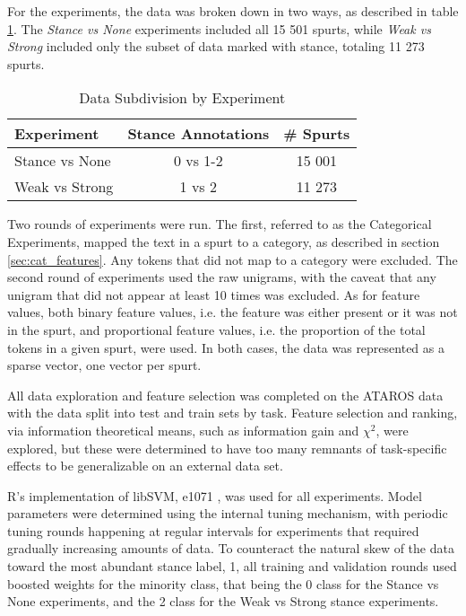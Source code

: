 For the experiments, the data was broken down in two ways, as described in table \ref{tab:experiment_breakdown}.  The \emph{Stance vs None} experiments included all 15 501 spurts, while \emph{Weak vs Strong} included only the subset of data marked with stance, totaling 11 273 spurts. 

\begin{table}[H]
\centering
\begin{tabular}{l | c | c}
	\textbf{Experiment} & \textbf{Stance Annotations} & \textbf{\# Spurts} \\ 
	\hline 
	Stance vs None & 0 vs 1-2           & 15 001 \\
	Weak vs Strong & 1 vs 2             & 11 273 \\ 
\end{tabular}
\caption{Data Subdivision by Experiment} 
\label{tab:experiment_breakdown} 
\end{table} 

Two rounds of experiments were run.  The first, referred to as the Categorical Experiments, mapped the text in a spurt to a category, as described in section \ref{sec:cat_features}. %
Any tokens that did not map to a category were excluded.  The second round of experiments used the raw unigrams, with the caveat that any unigram that did not appear at least 10 times was excluded.  As for feature values, both binary feature values, i.e. the feature was either present or it was not in the spurt, and proportional feature values, i.e. the proportion of the total tokens in a given spurt, were used.  In both cases, the data was represented as a sparse vector, one vector per spurt.  

All data exploration and feature selection was completed on the ATAROS data with the data split into test and train sets by task. Feature selection and ranking, via information theoretical means, such as information gain and $\chi^2$, were explored, but these were determined to have too many remnants of task-specific effects to be generalizable on an external data set. 

R's implementation of libSVM, e1071 \citep {meyer2014e1071}, was used for all experiments.  Model parameters were determined using the internal tuning mechanism, with periodic tuning rounds happening at regular intervals for experiments that required gradually increasing amounts of data.  To counteract the natural skew of the data toward the most abundant stance label, 1, all training and validation rounds used boosted weights for the minority class, that being the 0 class for the Stance vs None experiments, and the 2 class for the Weak vs Strong stance experiments.  
